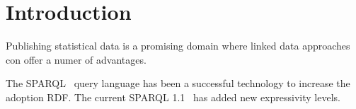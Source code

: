 \section{Introduction}

Publishing statistical data is a promising domain where linked data approaches
con offer a numer of advantages. 


The SPARQL~\cite{SPARQL10} query language has been a successful technology to
increase the adoption RDF. 
The current SPARQL 1.1~\cite{SPARQL11} has added
new expressivity levels. 



